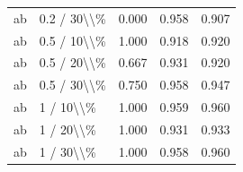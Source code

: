 \begin{table}[!h]
\begin{tabular}[t]{llccc}
\addlinespace
ab & 0.2 / 30\textbackslash{}\textbackslash{}\% & 0.000 & 0.958 & 0.907\\
ab & 0.5 / 10\textbackslash{}\textbackslash{}\% & 1.000 & 0.918 & 0.920\\
ab & 0.5 / 20\textbackslash{}\textbackslash{}\% & 0.667 & 0.931 & 0.920\\
ab & 0.5 / 30\textbackslash{}\textbackslash{}\% & 0.750 & 0.958 & 0.947\\
ab & 1 / 10\textbackslash{}\textbackslash{}\% & 1.000 & 0.959 & 0.960\\
\addlinespace
ab & 1 / 20\textbackslash{}\textbackslash{}\% & 1.000 & 0.931 & 0.933\\
ab & 1 / 30\textbackslash{}\textbackslash{}\% & 1.000 & 0.958 & 0.960\\
\bottomrule
\end{tabular}
\end{table}
